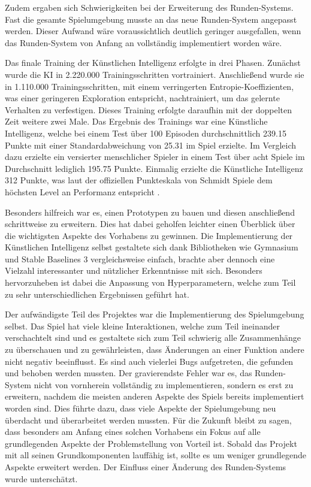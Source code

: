 Zudem ergaben sich Schwierigkeiten bei der Erweiterung des Runden-Systems. Fast die gesamte Spielumgebung musste an das neue Runden-System angepasst werden. Dieser Aufwand wäre voraussichtlich deutlich geringer ausgefallen, wenn das Runden-System von Anfang an vollständig implementiert worden wäre.

Das finale Training der Künstlichen Intelligenz erfolgte in drei Phasen. Zunächst wurde die KI in 2.220.000 Trainingsschritten vortrainiert. Anschließend wurde sie in 1.110.000 Trainingsschritten, mit einem verringerten Entropie-Koeffizienten, was einer geringeren Exploration entspricht, nachtrainiert, um das gelernte Verhalten zu verfestigen. Dieses Training erfolgte daraufhin mit der doppelten Zeit weitere zwei Male. Das Ergebnis des Trainings war eine Künstliche Intelligenz, welche bei einem Test über 100 Episoden durchschnittlich 239.15 Punkte mit einer Standardabweichung von 25.31 im Spiel erzielte. Im Vergleich dazu erzielte ein versierter menschlicher Spieler in einem Test über acht Spiele im Durchschnitt lediglich 195.75 Punkte. Einmalig erzielte die Künstliche Intelligenz 312 Punkte, was laut der offiziellen Punkteskala von Schmidt Spiele dem höchsten Level an Performanz entspricht \cite{schmidtspiele_ganzschonclever}.

Besonders hilfreich war es, einen Prototypen zu bauen und diesen anschließend schrittweise zu erweitern. Dies hat dabei geholfen leichter einen Überblick über die wichtigsten Aspekte des Vorhabens zu gewinnen. Die Implementierung der Künstlichen Intelligenz selbst gestaltete sich dank Bibliotheken wie Gymnasium und Stable Baselines 3 vergleichsweise einfach, brachte aber dennoch eine Vielzahl interessanter und nützlicher Erkenntnisse mit sich. Besonders hervorzuheben ist dabei die Anpassung von Hyperparametern, welche zum Teil zu sehr unterschiedlichen Ergebnissen geführt hat. 

Der aufwändigste Teil des Projektes war die Implementierung des Spielumgebung selbst. Das Spiel hat viele kleine Interaktionen, welche zum Teil ineinander verschachtelt sind und es gestaltete sich zum Teil schwierig alle Zusammenhänge zu überschauen und zu gewährleisten, dass Änderungen an einer Funktion andere nicht negativ beeinflusst. Es sind auch vielerlei Bugs aufgetreten, die gefunden und behoben werden mussten. Der gravierendste Fehler war es, das Runden-System nicht von vornherein vollständig zu implementieren, sondern es erst zu erweitern, nachdem die meisten anderen Aspekte des Spiels bereits implementiert worden sind. Dies führte dazu, dass viele Aspekte der Spielumgebung neu überdacht und überarbeitet werden mussten. Für die Zukunft bleibt zu sagen, dass besonders am Anfang eines solchen Vorhabens ein Fokus auf alle grundlegenden Aspekte der Problemstellung von Vorteil ist. Sobald das Projekt mit all seinen Grundkomponenten lauffähig ist, sollte es um weniger grundlegende Aspekte erweitert werden. Der Einfluss einer Änderung des Runden-Systems wurde unterschätzt.\\


